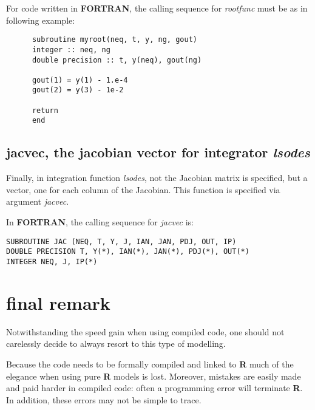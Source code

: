 \documentclass[english]{article}
\newcommand{\R}{\textbf{\textsf{R}}\xspace}
\newcommand{\FOR}{\textbf{\textsf{FORTRAN}}\xspace}
\begin{document}
For code written in \FOR, the calling sequence for \emph{rootfunc} must be as in 
following example: 
\begin{verbatim}
      subroutine myroot(neq, t, y, ng, gout)
      integer :: neq, ng
      double precision :: t, y(neq), gout(ng)

      gout(1) = y(1) - 1.e-4
      gout(2) = y(3) - 1e-2
      
      return
      end
\end{verbatim}
\subsection{jacvec, the jacobian vector for integrator \emph{lsodes}}
Finally, in integration function \emph{lsodes}, not the Jacobian matrix 
is specified, but a vector, one for each column of the Jacobian. 
This function is specified via argument \emph{jacvec}.


In \FOR, the calling sequence for \emph{jacvec} is: 
\begin{verbatim}
SUBROUTINE JAC (NEQ, T, Y, J, IAN, JAN, PDJ, OUT, IP)
DOUBLE PRECISION T, Y(*), IAN(*), JAN(*), PDJ(*), OUT(*)
INTEGER NEQ, J, IP(*) 
\end{verbatim}


\section{final remark}
Notwithstanding the speed gain when using compiled code, one should not carelessly
decide to always resort to this type of modelling. 

Because the code needs to be formally compiled and linked to \R much of the elegance
when using pure \R models is lost. Moreover, mistakes are easily made and paid harder
in compiled code: often a programming error will terminate \R. In addition, these errors 
may not be simple to trace.

\endgroup
\end{document}
